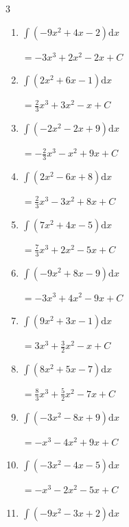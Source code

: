\begin{multicols}{3}
\begin{enumerate}
        $\displaystyle =-\frac{1}{3}x^{3}-x^{2}-2x+ C$

  \item $\displaystyle \int \left( -9x^{2}+4x-2 \right) \mathrm{d}x$

        $\displaystyle =-3x^{3}+2x^{2}-2x+ C$

  \item $\displaystyle \int \left( 2x^{2}+6x-1 \right) \mathrm{d}x$

        $\displaystyle =\frac{2}{3}x^{3}+3x^{2}-x+ C$

  \item $\displaystyle \int \left( -2x^{2}-2x+9 \right) \mathrm{d}x$

        $\displaystyle =-\frac{2}{3}x^{3}-x^{2}+9x+ C$

  \item $\displaystyle \int \left( 2x^{2}-6x+8 \right) \mathrm{d}x$

        $\displaystyle =\frac{2}{3}x^{3}-3x^{2}+8x+ C$

  \item $\displaystyle \int \left( 7x^{2}+4x-5 \right) \mathrm{d}x$

        $\displaystyle =\frac{7}{3}x^{3}+2x^{2}-5x+ C$

  \item $\displaystyle \int \left( -9x^{2}+8x-9 \right) \mathrm{d}x$

        $\displaystyle =-3x^{3}+4x^{2}-9x+ C$

  \item $\displaystyle \int \left( 9x^{2}+3x-1 \right) \mathrm{d}x$

        $\displaystyle =3x^{3}+\frac{3}{2}x^{2}-x+ C$

\columnbreak %

  \item $\displaystyle \int \left( 8x^{2}+5x-7 \right) \mathrm{d}x$

        $\displaystyle =\frac{8}{3}x^{3}+\frac{5}{2}x^{2}-7x+ C$

  \item $\displaystyle \int \left( -3x^{2}-8x+9 \right) \mathrm{d}x$

        $\displaystyle =-x^{3}-4x^{2}+9x+ C$

  \item $\displaystyle \int \left( -3x^{2}-4x-5 \right) \mathrm{d}x$

        $\displaystyle =-x^{3}-2x^{2}-5x+ C$

  \item $\displaystyle \int \left( -9x^{2}-3x+2 \right) \mathrm{d}x$


\end{enumerate}
\end{multicols}
